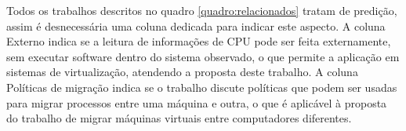 Todos os trabalhos descritos no quadro \ref{quadro:relacionados} tratam de
predição, assim é desnecessária uma coluna dedicada para indicar este aspecto.
A coluna Externo indica se a leitura de informações de CPU pode ser feita
externamente, sem executar software dentro do sistema observado, o que permite
a aplicação em sistemas de virtualização, atendendo a proposta deste trabalho.
A coluna Políticas de migração indica se o trabalho discute políticas que podem
ser usadas para migrar processos entre uma máquina e outra, o que é aplicável à
proposta do trabalho de migrar máquinas virtuais entre computadores diferentes.

